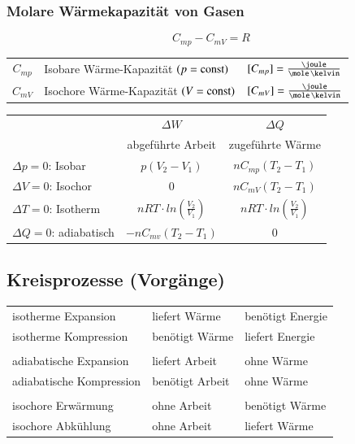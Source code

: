 \subsubsection{Molare Wärmekapazität von Gasen}

$$\boxed{C_{mp} - C_{mV} = R} $$

\renewcommand{\arraystretch}{1.3}
\begin{tabular}{c l l}
	$C_{mp}$ 	& Isobare Wärme-Kapazität $(p = \mathop{} \! \mathrm{const})$ 									& $[C_{mp}] = \frac{\joule}{\mole \, \kelvin}$	\\
	$C_{mV}$ 	& Isochore Wärme-Kapazität $(V = \mathop{} \! \mathrm{const})$ 									& $[C_{mV}] = \frac{\joule}{\mole \, \kelvin}$	\\
\end{tabular}
\renewcommand{\arraystretch}{1}

\renewcommand{\arraystretch}{1.4}
\begin{center}
	\begin{tabular}{|l|c|c|}
		\hline
		& $\Delta W$ 			& $\Delta Q$ 		\\
		& {\tiny abgeführte Arbeit} 	& {\tiny zugeführte Wärme}	\\
		\hline
		$\Delta p = 0$: Isobar 	& $p(V_2-V_1)$			& $nC_{mp}(T_2-T_1)$\\
		\hline
		$\Delta V = 0$: Isochor	& $0$					& $nC_{mV}(T_2-T_1)$	\\
		\hline
		$\Delta T = 0$: Isotherm	& $nRT \cdot ln(\frac{V_2}{V_1})$& $nRT \cdot ln(\frac{V_2}{V_1})$		\\
		\hline
		$\Delta Q = 0$: adiabatisch & $-nC_{mv}(T_2-T_1)$& $0$				\\
		\hline	
	\end{tabular}
\end{center}
\renewcommand{\arraystretch}{1}

\subsection{Kreisprozesse (Vorgänge)}

\begin{tabular}{lll}
	isotherme Expansion 		& liefert Wärme 	& benötigt Energie	\\
	isotherme Kompression 		& benötigt Wärme 	& liefert Energie 	\\
	\\
	adiabatische Expansion 		& liefert Arbeit 	& ohne Wärme 		\\
	adiabatische Kompression 	& benötigt Arbeit 	& ohne Wärme 		\\
	\\
	isochore Erwärmung 			& ohne Arbeit 		& benötigt Wärme 	\\
	isochore Abkühlung 			& ohne Arbeit 		& liefert Wärme
\end{tabular}


